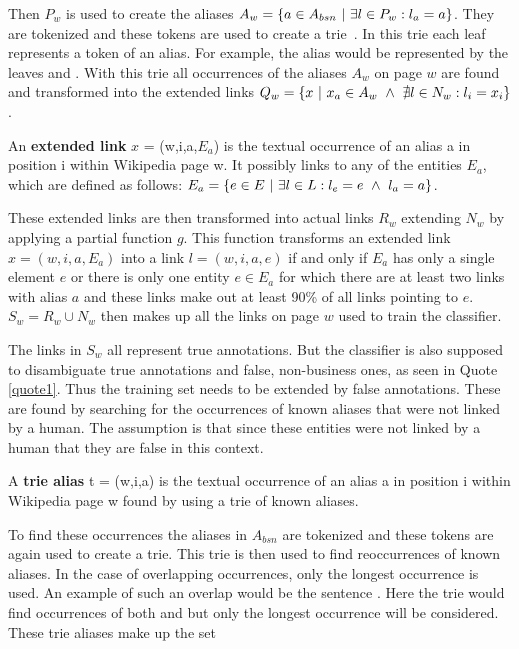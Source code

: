 Then $P_w$ is used to create the aliases $A_w = \{a \in A_{bsn} {\mbox{ }|\mbox{ }} \exists l \in P_w: l_a = a \}$. They are tokenized and these tokens are used to create a trie\ \cite{Fredkin:1960:TM:367390.367400}. In this trie each leaf represents a token of an alias. For example, the alias  would be represented by the leaves  and . With this trie all occurrences of the aliases $A_w$ on page $w$ are found and transformed into the extended links $Q_w = \{ x {\mbox{ }|\mbox{ }} x_a \in A_w {\mbox{ }\wedge\mbox{ }} \nexists l \in N_w: l_i = x_i \}$.\par
\begin{definition}
An \textbf{extended link} $x$ = (w,i,a,$E_a$) is the textual occurrence of an alias a in position i within Wikipedia page w. It possibly links to any of the entities $E_a$, which are defined as follows: $E_a = \{ e \in E {\mbox{ }|\mbox{ }} \exists l \in L: l_e = e {\mbox{ }\wedge\mbox{ }} l_a = a \}$.
\label{extendedlink}
\end{definition}
These extended links are then transformed into actual links $R_w$ extending $N_w$ by applying a partial function $g$.
This function transforms an extended link $x = (w,i,a,E_a)$ into a link $l = (w,i,a,e)$ if and only if $E_a$ has only a single element $e$ or there is only one entity $e \in E_a$ for which there are at least two links with alias $a$ and these links make out at least 90\% of all links pointing to $e$. $S_w = R_w \cup N_w$ then makes up all the links on page $w$ used to train the classifier.\par
The links in $S_w$ all represent true annotations. But the classifier is also supposed to disambiguate true annotations and false, non-business ones, as seen in Quote \ref{quote1}. Thus the training set needs to be extended by false annotations. These are found by searching for the occurrences of known aliases that were not linked by a human. The assumption is that since these entities were not linked by a human that they are false in this context.
\begin{definition}
A \textbf{trie alias} t = (w,i,a) is the textual occurrence of an alias a in position i within Wikipedia page w found by using a trie of known aliases.
\label{triealias}
\end{definition}
To find these occurrences the aliases in $A_{bsn}$ are tokenized and these tokens are again used to create a trie. This trie is then used to find reoccurrences of known aliases. In the case of overlapping occurrences, only the longest occurrence is used. An example of such an overlap would be the sentence . Here the trie would find occurrences of both  and  but only the longest occurrence will be considered. These trie aliases make up the set

